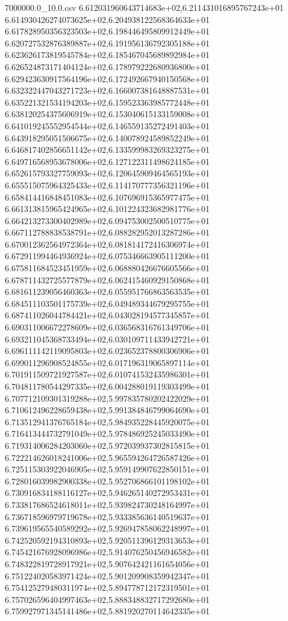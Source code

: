 \begin{filecontents*}{7000000.0_10.0.csv}
6.612031960643714683e+02,6.211431016895767243e+01
6.614930426274073625e+02,6.204938122568364633e+01
6.617828950356323503e+02,6.198446495809912449e+01
6.620727532876389887e+02,6.191956136792305188e+01
6.623626173819545784e+02,6.185467045689892984e+01
6.626524873171404124e+02,6.178979222680936800e+01
6.629423630917564196e+02,6.172492667940150568e+01
6.632322447043271723e+02,6.166007381648887531e+01
6.635221321534194203e+02,6.159523363985772448e+01
6.638120254375606919e+02,6.153040615133159008e+01
6.641019245552954544e+02,6.146559135272491403e+01
6.643918295051506675e+02,6.140078924589852249e+01
6.646817402856651142e+02,6.133599983269323275e+01
6.649716568953678006e+02,6.127122311498624185e+01
6.652615793327759093e+02,6.120645909464565193e+01
6.655515075964325433e+02,6.114170777356321196e+01
6.658414416848451083e+02,6.107696915365977475e+01
6.661313815965424965e+02,6.101224323682981776e+01
6.664213273300402989e+02,6.094753002500510775e+01
6.667112788838538791e+02,6.088282952013287286e+01
6.670012362564972364e+02,6.081814172416306974e+01
6.672911994464936924e+02,6.075346663905111200e+01
6.675811684523451959e+02,6.068880426676605566e+01
6.678711432725577879e+02,6.062415460929150868e+01
6.681611239056460363e+02,6.055951766863563535e+01
6.684511103501175739e+02,6.049489344679295755e+01
6.687411026044784421e+02,6.043028194577345857e+01
6.690311006672278609e+02,6.036568316761349706e+01
6.693211045368733494e+02,6.030109711433942721e+01
6.696111142119095803e+02,6.023652378800306906e+01
6.699011296908524855e+02,6.017196319065897114e+01
6.701911509721927587e+02,6.010741532435986301e+01
6.704811780544297335e+02,6.004288019119303499e+01
6.707712109301319288e+02,5.997835780202422029e+01
6.710612496228659438e+02,5.991384846799064690e+01
6.713512941376765184e+02,5.984935228445920075e+01
6.716413444732791049e+02,5.978486925245033490e+01
6.719314006284203060e+02,5.972039937302815815e+01
6.722214626018241006e+02,5.965594264726587426e+01
6.725115303922046905e+02,5.959149907622850151e+01
6.728016039982900338e+02,5.952706866101198102e+01
6.730916834188116127e+02,5.946265140272953431e+01
6.733817686524618011e+02,5.939824730248164997e+01
6.736718596979719678e+02,5.933385636140519637e+01
6.739619565540589292e+02,5.926947858062248997e+01
6.742520592194310893e+02,5.920511396129313653e+01
6.745421676928096986e+02,5.914076250456946582e+01
6.748322819728917921e+02,5.907642421161654056e+01
6.751224020583971424e+02,5.901209908359942347e+01
6.754125279480311974e+02,5.894778712172319501e+01
6.757026596404997463e+02,5.888348832717292680e+01
6.759927971345141486e+02,5.881920270114642335e+01

\end{filecontents*}
